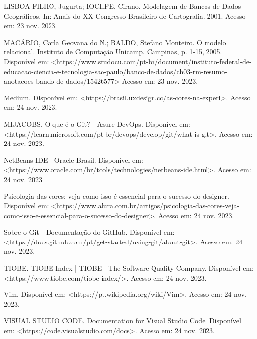 \documentclass[a4paper,12pt]{article}
\begin{document}
\noindent LISBOA FILHO, Jugurta; IOCHPE, Cirano. Modelagem de Bancos de Dados Geográficos. In: Anais do XX Congresso Brasileiro de Cartografia. 2001. Acesso em: 23 nov. 2023. \linebreak

\noindent MACÁRIO, Carla Geovana do N.; BALDO, Stefano Monteiro. O modelo relacional. Instituto de Computação Unicamp. Campinas, p. 1-15, 2005. 
Disponível em: <https://www.studocu.com/pt-br/document/instituto-federal-de-educacao-ciencia-e-tecnologia-sao-paulo/banco-de-dados/ch03-rm-resumo-anotacoes-bando-de-dados/15426577> 
Acesso em: 23 nov. 2023. \linebreak

\noindent Medium. Disponível em: <https://brasil.uxdesign.cc/as-cores-na-experi>. Acesso em: 24 nov. 2023. \linebreak

\noindent MIJACOBS. O que é o Git? - Azure DevOps. Disponível em: <https://learn.microsoft.com/pt-br/devops/develop/git/what-is-git>. Acesso em: 24 nov. 2023. \linebreak

\noindent NetBeans IDE | Oracle Brasil. Disponível em: <https://www.oracle.com/br/tools/technologies/netbeans-ide.html>. Acesso em: 24 nov. 2023 \linebreak

\noindent Psicologia das cores: veja como isso é essencial para o sucesso do designer. 
Disponível em: <https://www.alura.com.br/artigos/psicologia-das-cores-veja-como-isso-e-essencial-para-o-sucesso-do-designer>.
Acesso em: 24 nov. 2023. \linebreak 

\noindent Sobre o Git - Documentação do GitHub. Disponível em: <https://docs.github.com/pt/get-started/using-git/about-git>. Acesso em: 24 nov. 2023. \linebreak

\noindent TIOBE. TIOBE Index | TIOBE - The Software Quality Company. Disponível em: <https://www.tiobe.com/tiobe-index/>. Acesso em: 24 nov. 2023. \linebreak

\noindent Vim. Disponível em: <https://pt.wikipedia.org/wiki/Vim>. Acesso em: 24 nov. 2023. \linebreak

\noindent VISUAL STUDIO CODE. Documentation for Visual Studio Code. Disponível em: <https://code.visualstudio.com/docs>. Acesso em: 24 nov. 2023. \linebreak

\noindent 

\noindent

\end{document}
